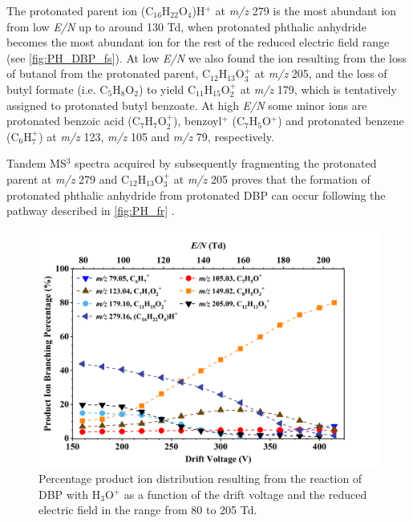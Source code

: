 %
The protonated parent ion  (C$_{16}$H$_{22}$O$_4$)H$^+$ at \textit{m/z} 279 is the most abundant ion from low \textit{E/N} up to around 130 Td, when protonated phthalic anhydride becomes the most abundant ion for the rest of the reduced electric field range (see \autoref{fig:PH_DBP_fs}).
%
At low \textit{E/N} we also found the  ion resulting from the loss of butanol from the protonated parent, C$_{12}$H$_{13}$O$_3^+$ at \textit{m/z} 205,  and the loss of butyl formate (i.e. C$_{5}$H$_{8}$O$_2$) to yield C$_{11}$H$_{15}$O$_2^+$ at \textit{m/z} 179, which is tentatively assigned to protonated butyl benzoate.
%
At high \textit{E/N} some minor ions are protonated benzoic acid (C$_{7}$H$_{7}$O$_2^+$), benzoyl$^+$ (C$_7$H$_{5}$O$^+$) and protonated benzene (C$_6$H$_{7}^+$) at \textit{m/z} 123, \textit{m/z} 105 and \textit{m/z} 79, respectively.


Tandem MS$^3$ spectra acquired by subsequently fragmenting the protonated parent at \textit{m/z} 279 and C$_{12}$H$_{13}$O$_3^+$ at \textit{m/z} 205 proves that the formation of protonated phthalic anhydride from protonated DBP can occur following the pathway described in \autoref{fig:PH_fr} \cite{mzcloudDBP}.
%



\begin{figure}[htb]%
\centering
\includegraphics[height=0.4\textheight]{pics/DBP-BR.png}
\caption{Percentage product ion distribution resulting from the reaction of DBP with H$_3$O$^+$ as a function of the drift voltage and the reduced electric field in the range from 80 to 205 Td.}
\label{fig:PH_DBP_fs}
\end{figure}




